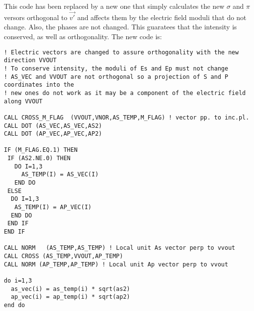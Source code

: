 \documentclass[a4paper,10pt]{article}
\begin{document}
\color{red}
This code has been replaced by a new one that simply calculates the new $\sigma$ and $\pi$ versors orthogonal to 
$\vec{v'}$ and affects them by the electric field moduli that do not change. Also, the phases are not changed. 
This guaratees that the intensity is conserved, as well as orthogonality. The new code is: 
\color{black}

\begin{lstlisting}
! Electric vectors are changed to assure orthogonality with the new direction VVOUT
! To conserve intensity, the moduli of Es and Ep must not change
! AS_VEC and VVOUT are not orthogonal so a projection of S and P coordinates into the
! new ones do not work as it may be a component of the electric field along VVOUT

CALL CROSS_M_FLAG  (VVOUT,VNOR,AS_TEMP,M_FLAG) ! vector pp. to inc.pl.
CALL DOT (AS_VEC,AS_VEC,AS2)
CALL DOT (AP_VEC,AP_VEC,AP2)

IF (M_FLAG.EQ.1) THEN
 IF (AS2.NE.0) THEN
   DO I=1,3
     AS_TEMP(I) = AS_VEC(I)
   END DO
 ELSE
  DO I=1,3
   AS_TEMP(I) = AP_VEC(I)
  END DO
 END IF
END IF

CALL NORM   (AS_TEMP,AS_TEMP) ! Local unit As vector perp to vvout
CALL CROSS (AS_TEMP,VVOUT,AP_TEMP)
CALL NORM (AP_TEMP,AP_TEMP) ! Local unit Ap vector perp to vvout

do i=1,3
  as_vec(i) = as_temp(i) * sqrt(as2)
  ap_vec(i) = ap_temp(i) * sqrt(ap2)
end do
\end{lstlisting}
\end{document}
